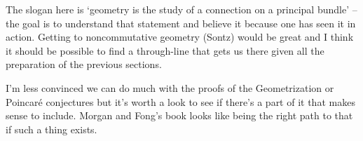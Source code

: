\documentclass[article]{article}
\begin{document}
The slogan here is `geometry is the study of a connection on a principal bundle' -- the goal is to understand that statement and believe it because one has seen it in action. Getting to noncommutative geometry (Sontz) would be great and I think it should be possible to find a through-line that gets us there given all the preparation of the previous sections. 

I'm less convinced we can do much with the proofs of the Geometrization or Poincar\'e conjectures but it's worth a look to see if there's a part of it that makes sense to include. Morgan and Fong's book looks like being the right path to that if such a thing exists.
\end{document}
